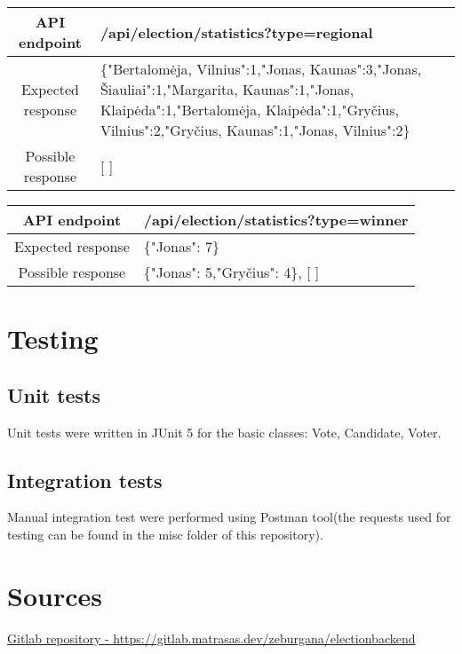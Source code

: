 \documentclass[12pt,a4paper]{article}
\begin{document}
\begin{center}
    \begin{tabular}{ |c|m{30em}| }
 \hline
 API endpoint & /api/election/statistics?type=regional \\ \hline
 Expected response & \{\newline"Bertalomėja, Vilnius":1,\newline"Jonas, Kaunas":3,\newline"Jonas, Šiauliai":1,\newline"Margarita, Kaunas":1,\newline"Jonas, Klaipėda":1,\newline"Bertalomėja, Klaipėda":1,\newline"Gryčius, Vilnius":2,\newline"Gryčius, Kaunas":1,\newline"Jonas, Vilnius":2\newline\} \\ \hline
 Possible response & [ ] \\ \hline
\end{tabular}
\end{center}

\begin{center}
\begin{tabular}{ |c|m{30em}| }
 \hline
 API endpoint & /api/election/statistics?type=winner \\ \hline
 Expected response & \{"Jonas": 7\} \\ \hline
 Possible response & \{"Jonas": 5,"Gryčius": 4\}, [ ] \\ \hline
\end{tabular}
\end{center}

\section{Testing}
\subsection{Unit tests}
Unit tests were written in JUnit 5 for the basic classes: Vote, Candidate, Voter.

\subsection{Integration tests}
Manual integration test were performed using Postman tool(the requests used for testing can be
found in the misc folder of this repository).

\section{Sources}
\hyperlink{https://gitlab.matrasas.dev/zeburgana/electionbackend}{Gitlab repository - https://gitlab.matrasas.dev/zeburgana/electionbackend}
\end{document}

